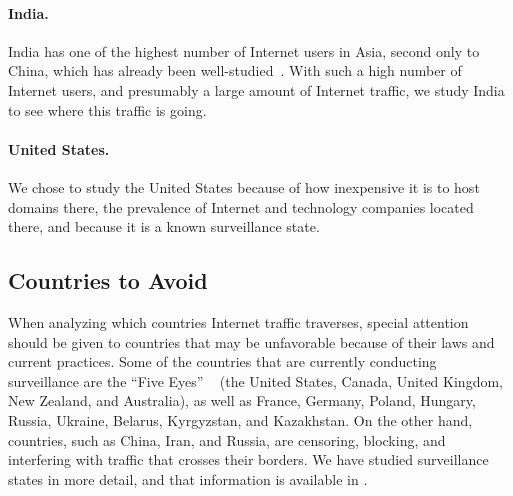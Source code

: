 \paragraph{India.}  India has one of the highest number of Internet users in Asia, second only to China, which has already been well-studied~\cite{tsui2003panopticon, wang2010discourse}.  With such a high number of Internet users, and presumably a large amount of Internet traffic, we study India to see where this traffic is going.

\paragraph{United States.}  We chose to study the United States because of how inexpensive it is to host domains there, the prevalence of Internet and technology companies located there, and because it is a known surveillance state.

\subsection{Countries to Avoid}

When analyzing which countries Internet traffic traverses, special attention should be given to countries that may be unfavorable because of their laws and current practices.  Some of the countries that are currently conducting surveillance are the ``Five Eyes'' ~\cite{lander2004international, eyeswideopen} (the United States, Canada, United Kingdom, New Zealand, and Australia), as well as France, Germany, Poland, Hungary, Russia, Ukraine, Belarus, Kyrgyzstan, and Kazakhstan.  On the other hand, countries, such as China, Iran, and Russia, are censoring, blocking, and interfering with traffic that crosses their borders.  We have studied surveillance states in more detail, and that information is available in \cite{characterizing_detours}.


